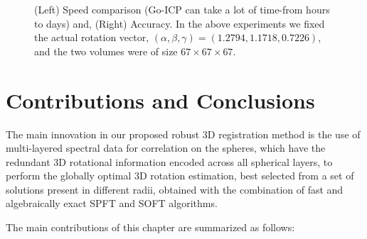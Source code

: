 \documentclass{UCF_ETD}
\begin{document}
\begin{figure}[h]
\begin{center}
\caption{ (Left) Speed comparison (Go-ICP can take a lot of time-from hours to days) and, (Right) Accuracy. In the above experiments we fixed the actual rotation vector, $(\alpha, \beta, \gamma) = (1.2794,   1.1718,    0.7226)$, and the two volumes were of size $67\times 67 \times 67$. }
\label{GoICPvsOursFinalComparison.fig}
\end{center}
\end{figure}


\section{Contributions and Conclusions}\label{Conclusions}
The main innovation in our proposed robust $3$D registration method is the use of multi-layered spectral data for correlation on the spheres, which have the redundant $3$D rotational information encoded across all spherical layers, to perform the globally optimal $3$D rotation estimation, best selected from a set of solutions present in different radii, obtained with the combination of fast and algebraically exact SPFT and SOFT algorithms.


The main contributions of this chapter are summarized as follows:
\end{document}
